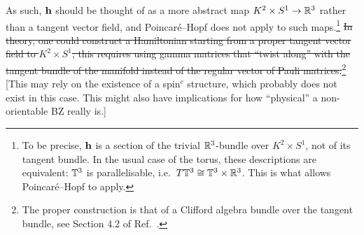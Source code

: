 As such, $\vb{h}$ should be thought of as a more abstract map $K^2\times S^1\to\mathbb{R}^3$ rather than a tangent vector field, and Poincaré--Hopf does not apply to such maps.\footnote{
	To be precise, $\vb{h}$ is a section of the trivial $\mathbb{R}^3$-bundle over $K^2\times S^1$, not of its tangent bundle. In the usual case of the torus, these descriptions are equivalent: $\mathbb{T}^3$ is parallelisable, i.e.\ $T\mathbb{T}^3\cong \mathbb{T}^3\times\mathbb{R}^3$. This is what allows Poincaré--Hopf to apply.}
{\color{red}
\st{In theory, one could construct a Hamiltonian starting from a proper tangent vector field to $K^2\times S^1$; this requires using gamma matrices that ``twist along'' with the tangent bundle of the manifold instead of the regular vector of Pauli matrices.}\footnote{\color{red}
	The proper construction is that of a Clifford algebra bundle over the tangent bundle, see Section 4.2 of Ref.~\cite{Mathai_math-review}.}
[This may rely on the existence of a spin$^c$ structure, which probably does not exist in this case. This might also have implications for how ``physical'' a non-orientable BZ really is.]
}

